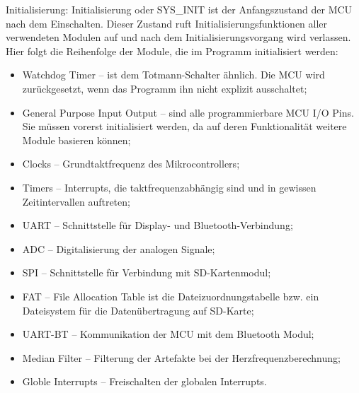 Initialisierung: Initialisierung oder SYS\_INIT ist der Anfangszustand der MCU nach dem Einschalten. Dieser Zustand ruft Initialisierungsfunktionen aller verwendeten Modulen auf und nach dem Initialisierungsvorgang wird verlassen. Hier folgt die Reihenfolge der Module, die im Programm initialisiert werden:
\begin{itemize}
    \item Watchdog Timer – ist dem Totmann-Schalter ähnlich. Die MCU wird zurückgesetzt, wenn das Programm ihn nicht explizit ausschaltet;
    \item General Purpose Input Output – sind alle programmierbare MCU I/O Pins. Sie müssen vorerst initialisiert werden, da auf deren Funktionalität weitere Module basieren können;
    \item Clocks – Grundtaktfrequenz des Mikrocontrollers;
    \item Timers – Interrupts, die taktfrequenzabhängig sind und in gewissen Zeitintervallen auftreten;
    \item UART – Schnittstelle für Display- und Bluetooth-Verbindung;
    \item ADC – Digitalisierung der analogen Signale;
    \item SPI – Schnittstelle für Verbindung mit SD-Kartenmodul;
    \item FAT – File Allocation Table ist die Dateizuordnungstabelle bzw. ein Dateisystem für die Datenübertragung auf SD-Karte;
    \item UART-BT – Kommunikation der MCU mit dem Bluetooth Modul;
    \item Median Filter – Filterung der Artefakte bei der Herzfrequenzberechnung;
    \item Globle Interrupts – Freischalten der globalen Interrupts.
\end{itemize}

